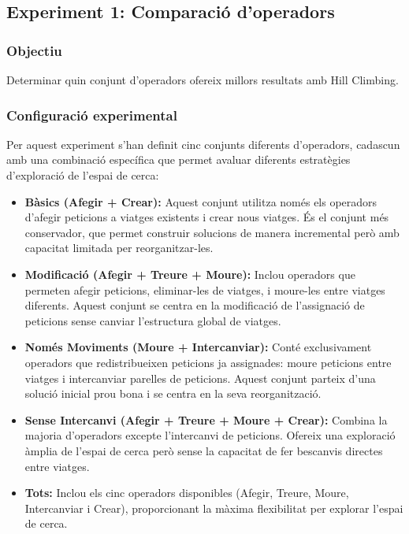 \subsection{Experiment 1: Comparació d'operadors}

\vspace{0.75cm}

\subsubsection{Objectiu}
Determinar quin conjunt d'operadors ofereix millors resultats amb Hill Climbing.

\vspace{0.5cm}


\subsubsection{Configuració experimental}

Per aquest experiment s'han definit cinc conjunts diferents d'operadors, cadascun amb una combinació específica que permet avaluar diferents estratègies d'exploració de l'espai de cerca:

\begin{itemize}
    \item \textbf{Bàsics (Afegir + Crear):} Aquest conjunt utilitza només els operadors d'afegir peticions a viatges existents i crear nous viatges. És el conjunt més conservador, que permet construir solucions de manera incremental però amb capacitat limitada per reorganitzar-les.
    
    \item \textbf{Modificació (Afegir + Treure + Moure):} Inclou operadors que permeten afegir peticions, eliminar-les de viatges, i moure-les entre viatges diferents. Aquest conjunt se centra en la modificació de l'assignació de peticions sense canviar l'estructura global de viatges.
    
    \item \textbf{Només Moviments (Moure + Intercanviar):} Conté exclusivament operadors que redistribueixen peticions ja assignades: moure peticions entre viatges i intercanviar parelles de peticions. Aquest conjunt parteix d'una solució inicial prou bona i se centra en la seva reorganització.
    
    \item \textbf{Sense Intercanvi (Afegir + Treure + Moure + Crear):} Combina la majoria d'operadors excepte l'intercanvi de peticions. Ofereix una exploració àmplia de l'espai de cerca però sense la capacitat de fer bescanvis directes entre viatges.
    
    \item \textbf{Tots:} Inclou els cinc operadors disponibles (Afegir, Treure, Moure, Intercanviar i Crear), proporcionant la màxima flexibilitat per explorar l'espai de cerca.
\end{itemize}

